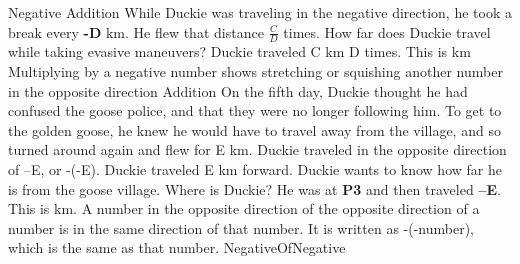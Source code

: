 \documentclass[a4paper,11pt ]{book}
\begin{document}
{Negative Addition}
{While Duckie was traveling in the negative direction, he took a break every \textbf{-D} km. He flew that distance $\frac{C}{D}$ times. How far does Duckie travel while taking evasive maneuvers?}
{Duckie traveled C km D times. This is  km}
{Multiplying by a negative number shows stretching or squishing another number in the opposite direction}
{Addition}
{On the fifth day, Duckie thought he had confused the goose police, and that they were no longer following him. To get to the golden goose, he knew he would have to travel away from the village, and so turned around again and flew for E km. Duckie traveled in the opposite direction of –E, or -(-E). Duckie traveled E km forward. Duckie wants to know how far he is from the goose village. Where is Duckie?}
{He was at \textbf{P3} and then traveled \textbf{--E}. This is  km.}
{A number in the opposite direction of the opposite direction of a number is in the same direction of that number. It is written as -(-number), which is the same as  that number.}
{NegativeOfNegative}
\end{document}
